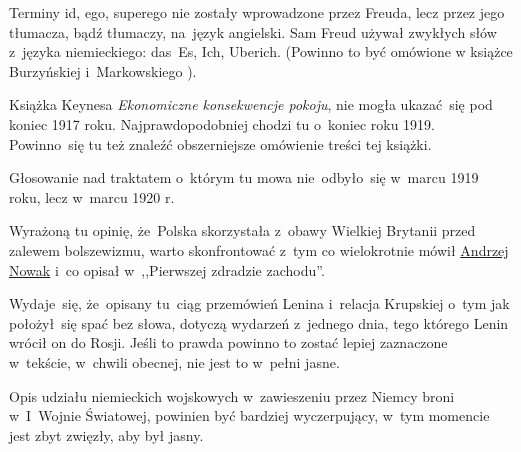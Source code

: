 \documentclass[a4paper,11pt]{article}
\begin{document}
\vspace{\spaceTwo}








\start {} Terminy id, ego, superego nie zostały wprowadzone
przez Freuda, lecz przez jego tłumacza, bądź tłumaczy, na~język
angielski. Sam Freud używał zwykłych słów z~języka niemieckiego:
das~Es, Ich, Uberich. (Powinno to być omówione w książce Burzyńskiej
i~Markowskiego \cite{BM09}).

\vspace{\spaceFour}


\start {} Książka Keynesa \emph{Ekonomiczne konsekwencje
  pokoju}, nie mogła ukazać~się pod koniec 1917 roku.
Najprawdopodobniej chodzi tu o~koniec roku 1919. Powinno~się tu też
znaleźć obszerniejsze omówienie treści tej książki.

\vspace{\spaceFour}


\start {} Głosowanie nad traktatem o~którym tu mowa
nie~odbyło~się w~marcu 1919 roku, lecz w~marcu 1920 r.

\vspace{\spaceFour}


\start {} Wyrażoną tu opinię, że~Polska skorzystała z~obawy
Wielkiej Brytanii przed zalewem bolszewizmu, warto skonfrontować z~tym
co wielokrotnie mówił
\href{https://www.youtube.com/watch?v=yfQ7rpq_irA}{Andrzej Nowak} i~co
opisał w~,,Pierwszej zdradzie zachodu''.

\vspace{\spaceFour}


\start {} Wydaje~się, że~opisany tu~ciąg przemówień Lenina
i~relacja Krupskiej o~tym jak położył~się spać bez słowa, dotyczą
wydarzeń z~jednego dnia, tego którego Lenin wrócił on do Rosji. Jeśli
to prawda powinno to zostać lepiej zaznaczone w~tekście, w~chwili
obecnej, nie jest to w~pełni jasne.

\vspace{\spaceFour}


\start {} Opis udziału niemieckich wojskowych w~zawieszeniu
przez Niemcy broni w~I~Wojnie Światowej, powinien być bardziej
wyczerpujący, w~tym momencie jest zbyt zwięzły, aby był jasny.
\end{document}
